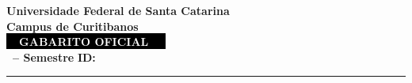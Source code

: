 \documentclass[10pt,a4paper]{article}
\makeatletter
\newcommand{\myCourse}{\@Course}
\newcommand{\mySemester}{\@Semester}
\newcommand{\myID}{\@ID}
\makeatother
\begin{document}
\thispagestyle{empty}
{\sf
\begin{center}
    \textbf{\LARGE Universidade Federal de Santa Catarina}\\[0.15cm]
    \textbf{\Large Campus de Curitibanos}\\[0.5cm]

    \colorbox{black}{\textcolor{white}{\textbf{\Large \ \ GABARITO OFICIAL \ \ }}}\\[0.5cm]

    \textbf{\large \myCourse \ -- Semestre \mySemester} \hfill \textbf{ID: \myID}
\end{center}

\vspace{0.2cm}
\hrule
\vspace{0.5cm}
}

\begin{enumerate}
\setlength{\itemsep}{1.5em}
\end{enumerate}
\end{document}

